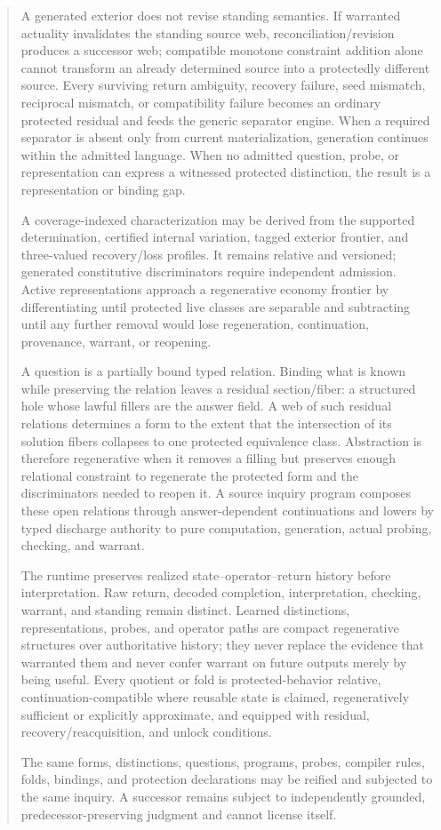 \documentclass[11pt,oneside]{article}
\begin{document}
\begin{quote}
A generated exterior does not revise standing semantics.  If warranted actuality invalidates the standing source web, reconciliation/revision produces a successor web; compatible monotone constraint addition alone cannot transform an already determined source into a protectedly different source.  Every surviving return ambiguity, recovery failure, seed mismatch, reciprocal mismatch, or compatibility failure becomes an ordinary protected residual and feeds the generic separator engine.  When a required separator is absent only from current materialization, generation continues within the admitted language.  When no admitted question, probe, or representation can express a witnessed protected distinction, the result is a representation or binding gap.

A coverage-indexed characterization may be derived from the supported determination,
certified internal variation, tagged exterior frontier, and three-valued recovery/loss
profiles.  It remains relative and versioned; generated constitutive discriminators
require independent admission.  Active representations approach a regenerative
economy frontier by differentiating until protected live classes are separable and
subtracting until any further removal would lose regeneration, continuation,
provenance, warrant, or reopening.

A question is a partially bound typed relation.  Binding what is known while preserving the relation leaves a residual section/fiber: a structured hole whose lawful fillers are the answer field.  A web of such residual relations determines a form to the extent that the intersection of its solution fibers collapses to one protected equivalence class.  Abstraction is therefore regenerative when it removes a filling but preserves enough relational constraint to regenerate the protected form and the discriminators needed to reopen it.  A source inquiry program composes these open relations through answer-dependent continuations and lowers by typed discharge authority to pure computation, generation, actual probing, checking, and warrant.

The runtime preserves realized state--operator--return history before interpretation.  Raw return, decoded completion, interpretation, checking, warrant, and standing remain distinct.  Learned distinctions, representations, probes, and operator paths are compact regenerative structures over authoritative history; they never replace the evidence that warranted them and never confer warrant on future outputs merely by being useful.  Every quotient or fold is protected-behavior relative, continuation-compatible where reusable state is claimed, regeneratively sufficient or explicitly approximate, and equipped with residual, recovery/reacquisition, and unlock conditions.

The same forms, distinctions, questions, programs, probes, compiler rules, folds, bindings, and protection declarations may be reified and subjected to the same inquiry.  A successor remains subject to independently grounded, predecessor-preserving judgment and cannot license itself.
\end{quote}
\end{document}
